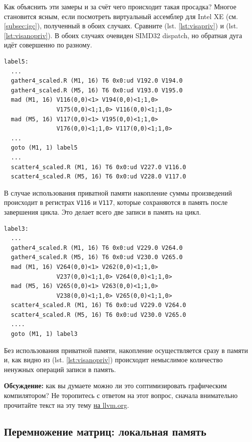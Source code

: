 \documentclass[a4paper,12pt,oneside]{article}
\begin{document}
Как объяснить эти замеры и за счёт чего происходит такая просадка? 
Многое становится ясным, если посмотреть виртуальный ассемблер для Intel XE (см. \ref{subsec:igc}), полученный в обоих случаях. Сравните (lst. \ref{lst:visapriv}) и (lst. \ref{lst:visanopriv}).
В обоих случаях очевиден SIMD32 dispatch, но обратная дуга идёт совершенно по разному.

\begin{lstlisting}[language={[x86masm]Assembler},caption={VISA ассемблер: счётчик в приватной памяти},label={lst:visapriv}]
label5:
  ...
  gather4_scaled.R (M1, 16) T6 0x0:ud V192.0 V194.0
  gather4_scaled.R (M5, 16) T6 0x0:ud V193.0 V195.0
  mad (M1, 16) V116(0,0)<1> V194(0,0)<1;1,0>
               V175(0,0)<1;1,0> V116(0,0)<1;1,0>
  mad (M5, 16) V117(0,0)<1> V195(0,0)<1;1,0>
               V176(0,0)<1;1,0> V117(0,0)<1;1,0>
  ...
  goto (M1, 1) label5
  ...
  scatter4_scaled.R (M1, 16) T6 0x0:ud V227.0 V116.0
  scatter4_scaled.R (M5, 16) T6 0x0:ud V228.0 V117.0
\end{lstlisting}

В случае использования приватной памяти накопление суммы произведений происходит в регистрах \lstinline!V116! и \lstinline!V117!, которые сохраняются в память после завершения цикла. Это делает всего две записи в память на цикл.

\begin{lstlisting}[language={[x86masm]Assembler},caption={VISA ассемблер: приватная память не использована},label={lst:visanopriv}]
label3:
  ...
  gather4_scaled.R (M1, 16) T6 0x0:ud V229.0 V264.0
  gather4_scaled.R (M5, 16) T6 0x0:ud V230.0 V265.0
  mad (M1, 16) V264(0,0)<1> V262(0,0)<1;1,0>
               V237(0,0)<1;1,0> V264(0,0)<1;1,0>
  mad (M5, 16) V265(0,0)<1> V263(0,0)<1;1,0>
               V238(0,0)<1;1,0> V265(0,0)<1;1,0>
  scatter4_scaled.R (M1, 16) T6 0x0:ud V229.0 V264.0
  scatter4_scaled.R (M5, 16) T6 0x0:ud V230.0 V265.0
  ....
  goto (M1, 1) label3
\end{lstlisting}

Без использования приватной памяти, накопление осуществляется сразу в памяти и, как видно из (lst. \ref{lst:visanopriv}) происходит немыслимое количество ненужных операций записи в память.

\textbf{Обсуждение:} как вы думаете можно ли это соптимизировать графическим компилятором? Не торопитесь с ответом на этот вопрос, сначала внимательно прочитайте текст на эту тему \href{https://llvm.org/docs/Atomics.html#id5}{на llvm.org}.

\subsection{Перемножение матриц: локальная память}\label{subsec:gemmlocal}
\end{document}
